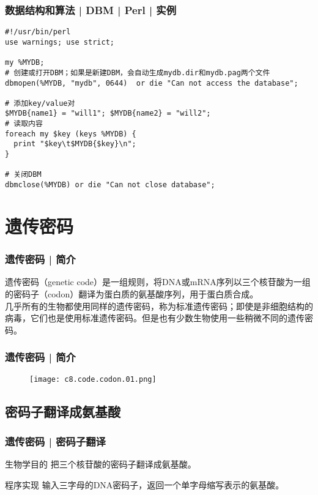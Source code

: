 \begin{frame}[fragile]
  \frametitle{数据结构和算法 | DBM | Perl | 实例}
\begin{lstlisting}[basicstyle=\small\tt]
#!/usr/bin/perl
use warnings; use strict;
 
my %MYDB;
# 创建或打开DBM；如果是新建DBM，会自动生成mydb.dir和mydb.pag两个文件
dbmopen(%MYDB, "mydb", 0644)  or die "Can not access the database";

# 添加key/value对
$MYDB{name1} = "will1"; $MYDB{name2} = "will2";
# 读取内容
foreach my $key (keys %MYDB) {
  print "$key\t$MYDB{$key}\n";
}

# 关闭DBM
dbmclose(%MYDB) or die "Can not close database";
\end{lstlisting}
\end{frame}

\section{遗传密码}
\begin{frame}
  \frametitle{遗传密码 | 简介}
  遗传密码（genetic code）是一组规则，将DNA或mRNA序列以三个核苷酸为一组的密码子（codon）翻译为蛋白质的氨基酸序列，用于蛋白质合成。\\
  \vspace{1em}
  几乎所有的生物都使用同样的遗传密码，称为标准遗传密码；即使是非细胞结构的病毒，它们也是使用标准遗传密码。但是也有少数生物使用一些稍微不同的遗传密码。
\end{frame}

\begin{frame}
  \frametitle{遗传密码 | 简介}
  \begin{figure}
    \centering
    \texttt{[image: c8.code.codon.01.png]}
  \end{figure}
\end{frame}

\subsection{密码子翻译成氨基酸}
\begin{frame}
  \frametitle{遗传密码 | 密码子翻译}
  \begin{block}{生物学目的}
 把三个核苷酸的密码子翻译成氨基酸。 
  \end{block}
  \pause
  \begin{block}{程序实现}
    输入三字母的DNA密码子，返回一个单字母缩写表示的氨基酸。
  \end{block}
\end{frame}

